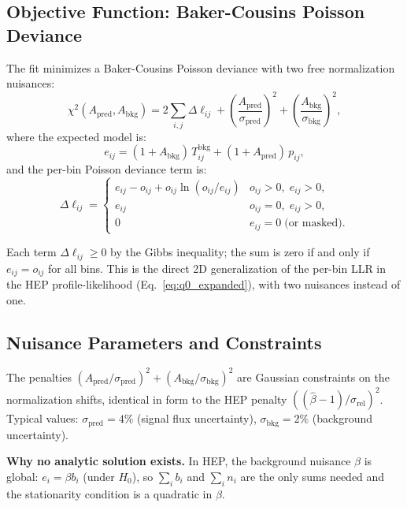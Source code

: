 \documentclass[12pt,a4paper]{article}
\newcommand{\bhat}{\hat{\beta}}
\newcommand{\srel}{\sigma_{\mathrm{rel}}}
\newcommand{\Tbkg}{T^{\mathrm{bkg}}}
\newcommand{\Apred}{A_{\mathrm{pred}}}
\newcommand{\Abkg}{A_{\mathrm{bkg}}}
\newcommand{\spred}{\sigma_{\mathrm{pred}}}
\newcommand{\sbkg}{\sigma_{\mathrm{bkg}}}
\begin{document}
\subsection{Objective Function: Baker-Cousins Poisson Deviance}
\label{sec:sens_objective}

The fit minimizes a Baker-Cousins Poisson deviance \cite{BakerCousins1984}
with two free normalization nuisances:
\begin{equation}
  \chi^2(\Apred,\Abkg) = 2\sum_{i,j}\Delta\ell_{ij}
    + \left(\frac{\Apred}{\spred}\right)^{\!2}
    + \left(\frac{\Abkg}{\sbkg}\right)^{\!2},
  \label{eq:sens_chisq}
\end{equation}
where the expected model is:
\begin{equation}
  e_{ij} = (1+\Abkg)\,\Tbkg_{ij} + (1+\Apred)\,p_{ij},
  \label{eq:sens_expected}
\end{equation}
and the per-bin Poisson deviance term is:
\begin{equation}
  \Delta\ell_{ij} =
  \begin{cases}
    e_{ij} - o_{ij} + o_{ij}\ln(o_{ij}/e_{ij}) & o_{ij}>0,\; e_{ij}>0,\\
    e_{ij} & o_{ij}=0,\; e_{ij}>0,\\
    0 & e_{ij}=0 \;\text{(or masked)}.
  \end{cases}
  \label{eq:sens_deviance}
\end{equation}

Each term $\Delta\ell_{ij} \ge 0$ by the Gibbs inequality; the sum is zero
if and only if $e_{ij} = o_{ij}$ for all bins.
This is the direct 2D generalization of the per-bin LLR in the HEP
profile-likelihood (Eq.~\eqref{eq:q0_expanded}), with two nuisances
instead of one.

\subsection{Nuisance Parameters and Constraints}
\label{sec:sens_nuisances}

The penalties $({\Apred}/{\spred})^2 + ({\Abkg}/{\sbkg})^2$ are
Gaussian constraints on the normalization shifts, identical in form to
the HEP penalty $((\bhat-1)/\srel)^2$.
Typical values: $\spred = 4\%$ (signal flux uncertainty),
$\sbkg = 2\%$ (background uncertainty).

\medskip
\noindent\textbf{Why no analytic solution exists.}
In HEP, the background nuisance $\beta$ is global: $e_i = \beta b_i$ (under $H_0$),
so $\sum_i b_i$ and $\sum_i n_i$ are the only sums needed and the stationarity
condition is a quadratic in $\beta$.
\end{document}
